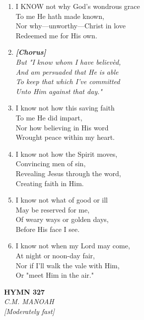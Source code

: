 \begin{enumerate}
    \item I KNOW not why God's wondrous grace \\
        To me He hath made known, \\
        Nor why---unworthy---Christ in love \\
        Redeemed me for His own.

    \item[] \vspace{0.4em}
    \textbf{\textit{[Chorus]}} \\
    \textit{But "I know whom I have believ\`ed,} \\
    \textit{And am persuaded that He is able} \\
    \textit{To keep that which I've committed} \\
    \textit{Unto Him against that day."}
    \vspace{0.4em}

    \item I know not how this saving faith \\
        To me He did impart, \\
        Nor how believing in His word \\
        Wrought peace within my heart.

    \item I know not how the Spirit moves, \\
        Convincing men of sin, \\
        Revealing Jesus through the word, \\
        Creating faith in Him.

    \item I know not what of good or ill \\
        May be reserved for me, \\
        Of weary ways or golden days, \\
        Before His face I see.

    \item I know not when my Lord may come, \\
        At night or noon-day fair, \\
        Nor if I'll walk the vale with Him, \\
        Or "meet Him in the air."

\end{enumerate}

\newpage
\begin{center}
    {\Large \textbf{HYMN 327}}
    \\
    \textit{C.M. MANOAH}
    \\
    \textit{\small [Moderately fast]}
\end{center}
\vspace{1em}


